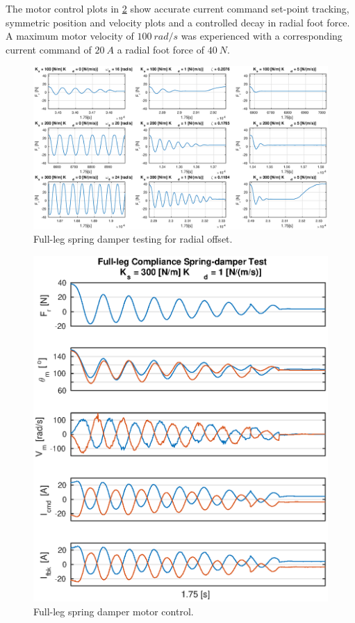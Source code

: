 The motor control plots in \cref{fig:full-leg-spring-damper-motor-control} show accurate current command set-point tracking, symmetric position and velocity plots and a controlled decay in radial foot force. A maximum motor velocity of $100\ rad/s$ was experienced with a corresponding current command of $20\ A$ a radial foot force of $40\ N$.

\begin{figure}
\centering
\includegraphics[width=1\textwidth]{images/experiments/spring-damper-tests2.eps} 
\caption{Full-leg spring damper testing for radial offset.}
\label{fig:spring-damper-tests}
\end{figure}

\begin{figure}
\centering
\includegraphics[width=1\textwidth]{images/experiments/full-leg-spring-damper-control-output.eps} 
\caption{Full-leg spring damper motor control.}
\label{fig:full-leg-spring-damper-motor-control}
\end{figure}

